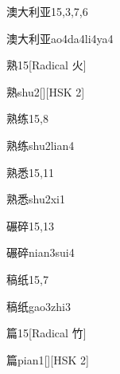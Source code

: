 \begin{entry}{澳大利亚}{15,3,7,6}
  \begin{phonetics}{澳大利亚}{ao4da4li4ya4}
  \end{phonetics}
\end{entry}

\begin{entry}{熟}{15}[Radical 火]
  \begin{phonetics}{熟}{shu2}[][HSK 2]
  \end{phonetics}
\end{entry}

\begin{entry}{熟练}{15,8}
  \begin{phonetics}{熟练}{shu2lian4}
  \end{phonetics}
\end{entry}

\begin{entry}{熟悉}{15,11}
  \begin{phonetics}{熟悉}{shu2xi1}
  \end{phonetics}
\end{entry}

\begin{entry}{碾碎}{15,13}
  \begin{phonetics}{碾碎}{nian3sui4}
  \end{phonetics}
\end{entry}

\begin{entry}{稿纸}{15,7}
  \begin{phonetics}{稿纸}{gao3zhi3}
  \end{phonetics}
\end{entry}

\begin{entry}{篇}{15}[Radical 竹]
  \begin{phonetics}{篇}{pian1}[][HSK 2]
  \end{phonetics}
\end{entry}

